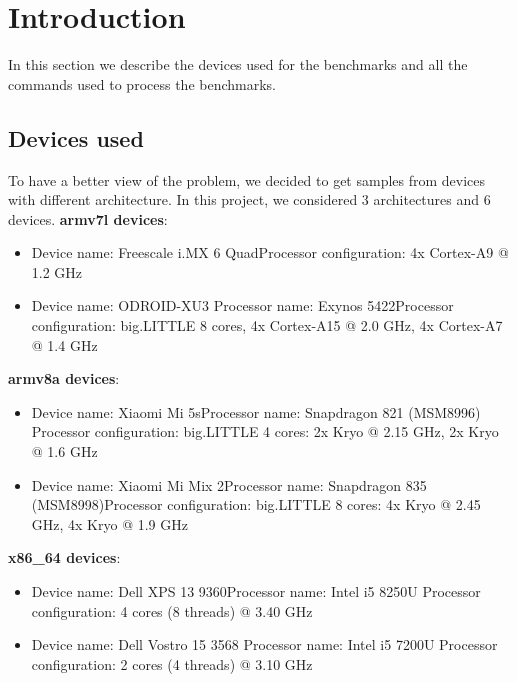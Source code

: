 \section{Introduction}

In this section we describe the devices used for the benchmarks and all the commands used to process the benchmarks.

\subsection{Devices used}

To have a better view of the problem, we decided to get samples from devices with different architecture.
In this project, we considered 3 architectures and 6 devices.\newline 
\textbf{armv7l devices}:
\begin{itemize}
	\item Device name: Freescale i.MX 6 Quad\newline Processor configuration: 4x Cortex-A9 @ 1.2 GHz
	\item Device name: ODROID-XU3 \newline Processor name: Exynos 5422\newline Processor configuration: big.LITTLE 8 cores, 4x Cortex-A15 @ 2.0 GHz, 4x Cortex-A7 @ 1.4 GHz 
\end{itemize}
\textbf{armv8a devices}:
\begin{itemize}
	\item Device name: Xiaomi Mi 5s\newline Processor name: Snapdragon 821 (MSM8996) \newline Processor configuration: big.LITTLE 4 cores: 2x Kryo @ 2.15 GHz, 2x Kryo @ 1.6 GHz
	\item Device name: Xiaomi Mi Mix 2\newline Processor name: Snapdragon 835 (MSM8998)\newline Processor configuration: big.LITTLE 8 cores: 4x Kryo @ 2.45 GHz, 4x Kryo @ 1.9 GHz
\end{itemize}
\textbf{x86\_64 devices}:
\begin{itemize}
	\item Device name: Dell XPS 13 9360\newline Processor name: Intel i5 8250U \newline Processor configuration: 4 cores (8 threads) @ 3.40 GHz
	\item Device name: Dell Vostro 15 3568 \newline Processor name: Intel i5 7200U
	\newline Processor configuration: 2 cores (4 threads) @ 3.10 GHz
\end{itemize}
\clearpage
